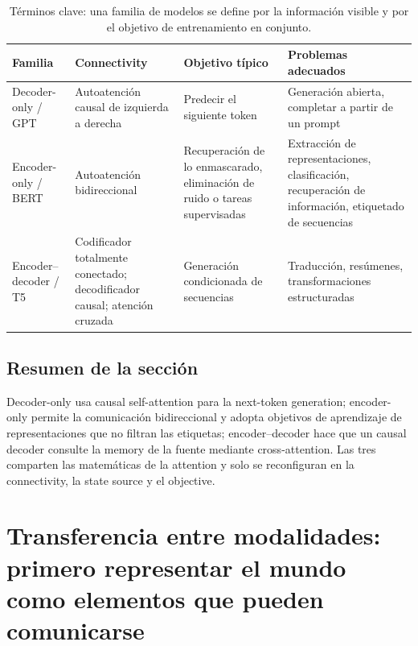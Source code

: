 \documentclass[a4paper]{article}
\begin{document}
\begin{table}[H]
\centering
\small
\begin{tabularx}{\textwidth}{L{2.8cm}L{3.5cm}L{3.2cm}X}
\toprule
Familia & Connectivity & Objetivo típico & Problemas adecuados \\
\midrule
Decoder-only / GPT & Autoatención causal de izquierda a derecha & Predecir el siguiente token & Generación abierta, completar a partir de un prompt \\
Encoder-only / BERT & Autoatención bidireccional & Recuperación de lo enmascarado, eliminación de ruido o tareas supervisadas & Extracción de representaciones, clasificación, recuperación de información, etiquetado de secuencias \\
Encoder--decoder / T5 & Codificador totalmente conectado; decodificador causal; atención cruzada & Generación condicionada de secuencias & Traducción, resúmenes, transformaciones estructuradas \\
\bottomrule
\end{tabularx}
\caption{Términos clave: una familia de modelos se define por la información visible y por el objetivo de entrenamiento en conjunto.}
\end{table}


\subsection{Resumen de la sección}

Decoder-only usa causal self-attention para la next-token generation; encoder-only permite la comunicación bidireccional y adopta objetivos de aprendizaje de representaciones que no filtran las etiquetas; encoder--decoder hace que un causal decoder consulte la memory de la fuente mediante cross-attention. Las tres comparten las matemáticas de la attention y solo se reconfiguran en la connectivity, la state source y el objective.
\section{Transferencia entre modalidades: primero representar el mundo como elementos que pueden comunicarse}
\end{document}
